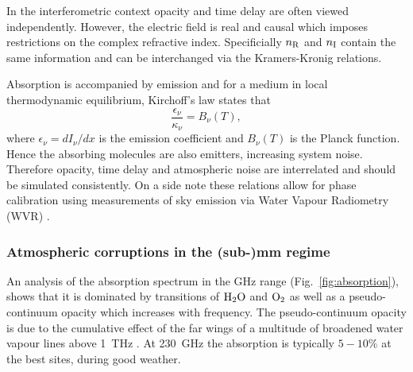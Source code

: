 In the interferometric context opacity and time delay are often viewed independently. However, the electric field is real and causal which imposes restrictions on the complex refractive index. Specificially $n_{\rm R}$ and $n_{\rm I}$ contain the same information and can be interchanged via the Kramers-Kronig relations. 

Absorption is accompanied by emission and for a medium in local thermodynamic equilibrium, Kirchoff's law states that 
\begin{equation}\label{kirchoff}
\frac{\epsilon_\nu}{\kappa_\nu}=B_\nu(T),
\end{equation}
where $\epsilon_\nu = dI_\nu/dx$ is the emission coefficient and $B_\nu(T)$ is the Planck function. Hence the absorbing molecules are also emitters, increasing system noise. Therefore opacity, time delay and atmospheric noise are interrelated and should be simulated consistently. On a side note these relations allow for phase calibration using measurements of sky emission via Water Vapour Radiometry (WVR) \citep*[e.g.][]{Carilli_1999}.

\subsubsection{Atmospheric corruptions in the (sub-)mm regime}
An analysis of the absorption spectrum in the GHz range (Fig.~\ref{fig:absorption}), shows that it is dominated by transitions of $\rm H_2O$ and $\rm O_2$ as well as a pseudo-continuum opacity which increases with frequency. The pseudo-continuum opacity is due to the cumulative effect of the far wings of a multitude of broadened water vapour lines above 1~THz \citep{Carilli_1999}. At 230~GHz the absorption is typically $5-10$\% at the best sites, during good weather. 

